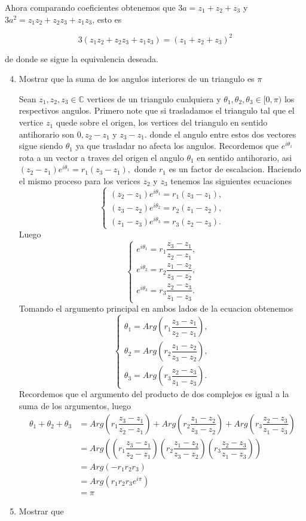\documentclass[11pt]{article}
\begin{document}
Ahora comparando coeficientes obtenemos que $3a=z_1+z_2+z_3$ y $3a^2=z_1z_2+z_2z_3+z_1z_3$, esto es 

$$3(z_1z_2+z_2z_3+z_1z_3)=(z_1+z_2+z_3)^2$$

de donde se sigue la equivalencia deseada.

\begin{enumerate}
  \setcounter{enumi}{3}
  \item Mostrar que la suma de los angulos interiores de un triangulo es $\pi$

  Sean $z_1,z_2,z_3\in \mathbb{C}$ vertices de un triangulo cualquiera y $\theta_1,\theta_2,\theta_3\in[0,\pi)$ los respectivos angulos. Primero note que si trasladamos el triangulo tal que el vertice $z_1$ quede sobre el origen, los vertices del triangulo en sentido antihorario son $0,z_2-z_1$ y $z_3-z_1.$ donde el angulo entre estos dos vectores sigue siendo $\theta_1$ ya que trasladar no afecta los angulos. Recordemos que $e^{i\theta_1}$ rota a un vector a traves del origen el angulo $\theta_1$ en sentido antihorario, asi $(z_2-z_1)e^{i\theta_1}=r_1(z_3-z_1),$ donde $r_1$ es un factor de escalacion. Haciendo el mismo proceso para los verices $z_2$ y $z_3$ tenemos las siguientes ecuaciones
  $$\begin{cases}
    (z_2-z_1)e^{i\theta_1}=r_1(z_3-z_1),\\
    (z_3-z_2)e^{i\theta_2}=r_2(z_1-z_2),\\
    (z_1-z_3)e^{i\theta_3}=r_3(z_2-z_3).
  \end{cases}$$
  Luego 
  $$\begin{cases}
    e^{i\theta_1}=r_1\dfrac{z_3-z_1}{z_2-z_1},\\
    e^{i\theta_2}=r_2\dfrac{z_1-z_2}{z_3-z_2},\\
    e^{i\theta_3}=r_3\dfrac{z_2-z_3}{z_1-z_3}.
  \end{cases}$$
  Tomando el argumento principal en ambos lados de la ecuacion obtenemos
  $$\begin{cases}
    \theta_1=Arg\left(r_1\dfrac{z_3-z_1}{z_2-z_1}\right),\\
    \theta_2=Arg\left(r_2\dfrac{z_1-z_2}{z_3-z_2}\right),\\
    \theta_3=Arg\left(r_3\dfrac{z_2-z_3}{z_1-z_3}\right).
  \end{cases}$$
  Recordemos que el argumento del producto de dos complejos es igual a la suma de los argumentos, luego
  \begin{align*}
    \theta_1+\theta_2+\theta_3&=Arg\left(r_1\dfrac{z_3-z_1}{z_2-z_1}\right)+Arg\left(r_2\dfrac{z_1-z_2}{z_3-z_2}\right)+Arg\left(r_3\dfrac{z_2-z_3}{z_1-z_3}\right)\\
    &=Arg\left(\left(r_1\dfrac{z_3-z_1}{z_2-z_1}\right)\left(r_2\dfrac{z_1-z_2}{z_3-z_2}\right)\left(r_3\dfrac{z_2-z_3}{z_1-z_3}\right)\right)\\
    &=Arg(-r_1r_2r_3)\\
    &=Arg(r_1r_2r_3e^{i\pi})\\
    &=\pi
  \end{align*}

  \item Mostrar que
\end{enumerate}
\end{document}
